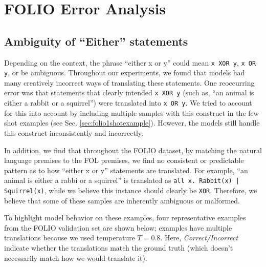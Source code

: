 \section{FOLIO Error Analysis}
\label{appendix_folio_error}

\subsection{Ambiguity of ``Either'' statements}
Depending on the context, the phrase ``either x or y'' could mean \texttt{x XOR y}, \texttt{x OR y}, or be ambiguous. Throughout our experiments, we found that models had many creatively incorrect ways of translating these statements. One reoccurring error was that statements that clearly intended \texttt{x XOR y} (such as, ``an animal is either a rabbit or a squirrel'') were translated into \texttt{x OR y}. We tried to account for this into account by including multiple samples with this construct in the few shot examples (see Sec. \ref{sec:folio1shotexample}). However, the models still handle this construct inconsistently and incorrectly. 

In addition, we find that throughout the FOLIO dataset, by matching the natural language premises to the FOL premises, we find no consistent or predictable pattern as to how ``either x or y'' statements are translated. For example, ``an animal is either a rabbi or a squirrel'' is translated as \texttt{all x. Rabbit(x) | Squirrel(x)}, while we believe this instance should clearly be \texttt{XOR}. Therefore, we believe that some of these samples are inherently ambiguous or malformed.

To highlight model behavior on these examples, four representative examples from the FOLIO validation set are shown below; examples have multiple translations because we used temperature $T=0.8$. Here, \textit{Correct/Incorrect} indicate whether the translations match the ground truth (which doesn't necessarily match how we would translate it).

